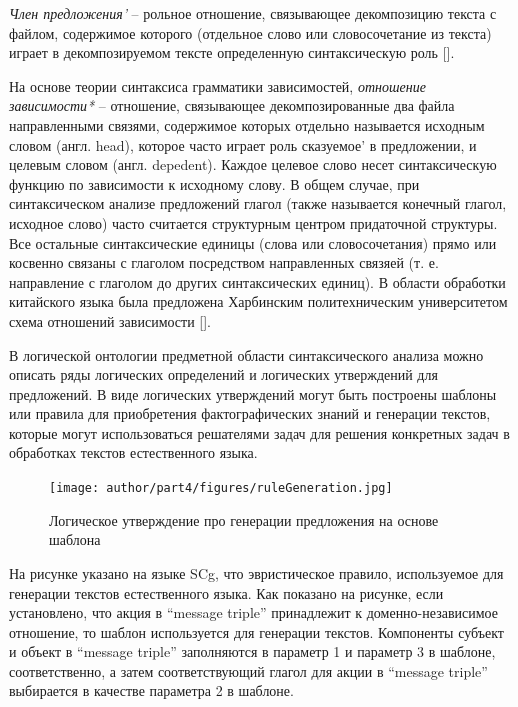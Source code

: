 \textit{Член предложения'} -- рольное отношение, связывающее декомпозицию текста с файлом, содержимое которого (отдельное слово или словосочетание из текста) играет в декомпозируемом тексте определенную синтаксическую роль [].

\begin{SCn}
\end{SCn}

На основе теории синтаксиса грамматики зависимостей, \textit{отношение зависимости*} -- отношение, связывающее декомпозированные два файла направленными связями, содержимое которых отдельно называется исходным словом (англ. head), которое часто играет роль сказуемое' в предложении, и целевым словом (англ. depedent). Каждое целевое слово несет синтаксическую функцию по зависимости к исходному слову. В общем случае, при синтаксическом анализе предложений глагол (также называется конечный глагол, исходное слово) часто считается структурным центром придаточной структуры. Все остальные синтаксические единицы (слова или словосочетания) прямо или косвенно связаны с глаголом посредством направленных связяей (т. е. направление с глаголом до других синтаксических единиц). В области обработки китайского языка была предложена Харбинским политехническим университетом схема отношений зависимости [].

В логической онтологии предметной области синтаксического анализа можно описать ряды логических определений и логических утверждений для предложений. В виде логических утверждений могут быть построены шаблоны или правила для приобретения фактографических знаний и генерации текстов, которые могут использоваться решателями задач для решения конкретных задач в обработках текстов естественного языка.
\begin{figure}[H]
	\centering
	\texttt{[image: author/part4/figures/ruleGeneration.jpg]}
	\caption{Логическое утверждение про генерации предложения на основе шаблона}
	\label{fig:template-generation}
\end{figure}

На рисунке \textit{} указано на языке SCg, что эвристическое правило, используемое для генерации текстов естественного языка. Как показано на рисунке, если установлено, что акция в ``message triple'' принадлежит к доменно-независимое отношение, то шаблон используется для генерации текстов. Компоненты субъект и объект в ``message triple'' заполняются в параметр 1 и параметр 3 в шаблоне, соответственно, а затем соответствующий глагол для акции в ``message triple'' выбирается в качестве параметра 2 в шаблоне. 

